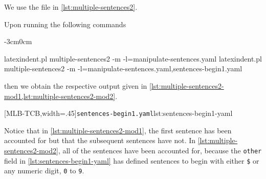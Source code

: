 \documentclass[10pt]{article}
\newenvironment{widepage}{\begin{adjustwidth}{-3cm}{0cm}}{\end{adjustwidth}}
\begin{document}
 \begin{example}
 We use the file in \cref{lst:multiple-sentences2}.


 Upon running the following commands  
 \begin{widepage}

  \begin{commandshell}
latexindent.pl multiple-sentences2 -m -l=manipulate-sentences.yaml
latexindent.pl multiple-sentences2 -m -l=manipulate-sentences.yaml,sentences-begin1.yaml
\end{commandshell}

 \end{widepage}
 then we obtain the respective output given in
 \cref{lst:multiple-sentences2-mod1,lst:multiple-sentences2-mod2}.

 \begin{cmhtcbraster}[
   raster force size=false,
   raster column 1/.style={add to width=1cm},
  ]
  [MLB-TCB,width=.45\textwidth]{\texttt{sentences-begin1.yaml}}{lst:sentences-begin1-yaml}
 \end{cmhtcbraster}
 Notice that in \cref{lst:multiple-sentences2-mod1}, the first sentence has been
 accounted for but that the subsequent sentences have not. In
 \cref{lst:multiple-sentences2-mod2}, all of the sentences have been accounted for,
 because the \texttt{other} field in \cref{lst:sentences-begin1-yaml} has defined
 sentences to begin with either \lstinline!$! or any numeric digit, \texttt{0} to
 \texttt{9}.
 \end{example}
\end{document}
